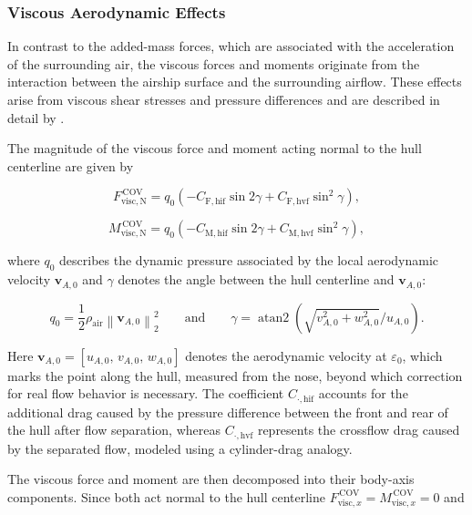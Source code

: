 \subsubsection{Viscous Aerodynamic Effects}
In contrast to the added-mass forces, which are associated with the acceleration of the surrounding air, the viscous forces and moments originate from the interaction between the airship surface and the surrounding airflow. These effects arise from viscous shear stresses and pressure differences and are described in detail by \cite{Anderson2017Fundamentals}.

The magnitude of the viscous force and moment acting normal to the hull centerline are given by

\begin{equation}
	F_\mathrm{visc, N}^\mathrm{\, COV}
	=
	q_0 \left( -C_\mathrm{F, hif} \sin2\gamma + C_\mathrm{F, hvf} \sin^2\gamma \right),
\end{equation} 

\begin{equation}
	M_\mathrm{visc, N}^\mathrm{\, COV}
	=
	q_0 \left( -C_\mathrm{M, hif} \sin2\gamma + C_\mathrm{M, hvf} \sin^2\gamma \right),
\end{equation} 

where $q_0$ describes the dynamic pressure associated by the local aerodynamic velocity $\bm{v}_{A, 0}$ and $\gamma$ denotes the angle between the hull centerline and $\bm{v}_{A, 0}$:

\begin{equation}
	q_0 
	= 
	\frac{1}{2}\rho_\mathrm{air} \left\| \bm{v}_{A, 0} \right\|^2_2
	\qquad
	\text{and}
	\qquad
	\gamma 
	= 
	\operatorname{atan2}\! \left( \sqrt{v_{A, 0}^2 + w_{A, 0}^2} / u_{A, 0} \right).
\end{equation}

Here $\bm{v}_{A, 0} = \left[u_{A, 0}, \, v_{A, 0}, \, w_{A, 0}\right]$ denotes the aerodynamic velocity at $\varepsilon_0$, which marks the point along the hull, measured from the nose, beyond which correction for real flow behavior is necessary.
The coefficient $C_\mathrm{\cdot, hif}$ accounts for the additional drag caused by the pressure difference between the front and rear of the hull after flow separation, whereas $C_\mathrm{\cdot, hvf}$ represents the crossflow drag caused by the separated flow, modeled using a cylinder-drag analogy.

The viscous force and moment are then decomposed into their body-axis components. Since both act normal to the hull centerline $F_{\mathrm{visc}, x}^\mathrm{\, COV} = M_{\mathrm{visc}, x}^\mathrm{\, COV} = 0$ and


